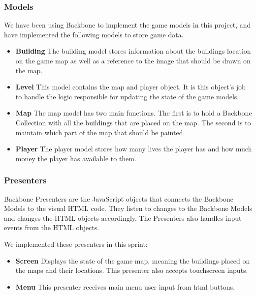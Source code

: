 \subsubsection*{Models}
	We have been using Backbone to implement the game models in this project, and have implemented 
	the following models to store game data.
	\begin{itemize}
		\item {\bf Building}
		The building model stores information about the buildings location on the game map as well as a reference 
		to the image that should be drawn on the map.
		\item {\bf Level}
		This model contains the map and player object. It is this object's job to handle the logic responsible for 
		updating the state of the game models.
		\item {\bf Map}
		The map model has two main functions. The first is to hold a Backbone Collection with all the buildings 
		that are placed on the map. The second is to maintain which part of the map that should be painted.
		\item {\bf Player} 
		The player model stores how many lives the player has and how much money the player has available to them.
	\end{itemize}

\subsubsection*{Presenters}
	Backbone Presenters are the JavaScript objects that connects the Backbone Models 
	to the visual HTML code. They listen to changes to the Backbone Models and changes 
	the HTML objects accordingly. The Presenters also handles input events from the HTML objects.
	
	We implemented these presenters in this sprint:
	\begin{itemize}
		\item{\bf Screen}
		Displays the state of the game map, meaning the buildings placed on the maps and their locations. This presenter also accepts touchscreen inputs.
		\item{\bf Menu}
		This presenter receives main menu user input from html buttons.
	\end{itemize}
	
